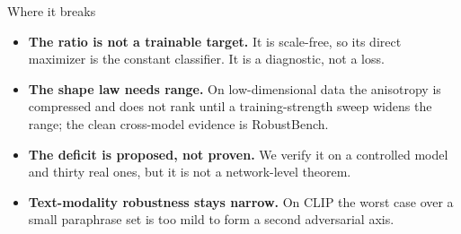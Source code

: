 \documentclass[aspectratio=169,10pt]{beamer}
\newcommand{\key}[1]{{\color{TUMdarker}\bfseries #1}}
\begin{document}
\begin{frame}{Where it breaks}{}
  \vspace{0.4em}
  \begin{itemize}\footnotesize\itemsep6pt
    \item \key{The ratio is not a trainable target.} It is scale-free, so its direct maximizer is the
      constant classifier. It is a diagnostic, not a loss.
    \item \key{The shape law needs range.} On low-dimensional data the anisotropy is compressed and does
      not rank until a training-strength sweep widens the range; the clean cross-model evidence is
      RobustBench.
    \item \key{The deficit is proposed, not proven.} We verify it on a controlled model and thirty real
      ones, but it is not a network-level theorem.
    \item \key{Text-modality robustness stays narrow.} On CLIP the worst case over a small paraphrase set
      is too mild to form a second adversarial axis.
  \end{itemize}
\end{frame}
\end{document}
